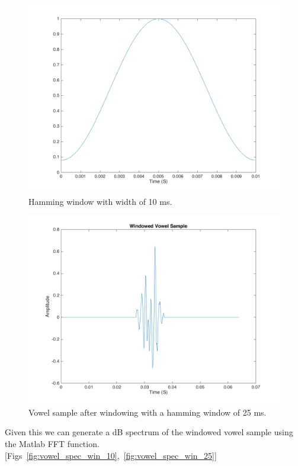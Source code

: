\documentclass{article}
\begin{document}
\begin{figure}[h]
  \centering
    \includegraphics[width=.4\textheight]{hamming_window.png}
  \caption{Hamming window with width of 10 ms.}
  \label{fig:hamming_window}
\end{figure}
\begin{figure}[h]
  \centering
    \includegraphics[width=.4\textheight]{vowel_windowed.png}
  \caption{Vowel sample after windowing with a hamming window of 25 ms.}
  \label{fig:vowel_windowed}
\end{figure}
Given this we can generate a dB spectrum of the windowed vowel sample using the Matlab FFT function. [Figs~\ref{fig:vowel_spec_win_10},~\ref{fig:vowel_spec_win_25}]
\end{document}

